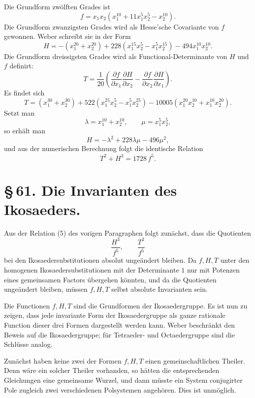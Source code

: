 \documentclass[11pt]{article}
\begin{document}
Die Grundform zwölften Grades ist
\begin{equation}
 f=x_1x_2(x_1^{10}+11x_1^5x_2^5-x_2^{10}).
\tag{1}
\end{equation}
Die Grundform zwanzigsten Grades wird als Hesse'sche Covariante von $f$ gewonnen. Weber schreibt sie in der Form
\begin{equation}
 H=-(x_1^{20}+x_2^{20})
    +228(x_1^{15}x_2^5-x_1^5x_2^{15})
    -494x_1^{10}x_2^{10}.
\tag{2}
\end{equation}
Die Grundform dreissigsten Grades wird als Functional-Determinante von $H$ und $f$ definirt:
\begin{equation}
 T=\frac1{20}\left(
 \frac{\partial f}{\partial x_1}\frac{\partial H}{\partial x_2}
-\frac{\partial f}{\partial x_2}\frac{\partial H}{\partial x_1}\right).
\tag{3}
\end{equation}
Es findet sich
\begin{equation}
 T=(x_1^{30}+x_2^{30})
 +522(x_1^{25}x_2^5-x_1^5x_2^{25})
 -10005(x_1^{20}x_2^{10}+x_1^{10}x_2^{20}).
\tag{4}
\end{equation}
Setzt man
\[
 \lambda=x_1^{10}+x_2^{10},\qquad \mu=x_1^5x_2^5,
\]
so erhält man
\[
 H=-\lambda^2+228\lambda\mu-496\mu^2,
\]
und aus der numerischen Berechnung folgt die identische Relation
\begin{equation}
 T^2+H^3=1728\,f^5.
\tag{5}
\end{equation}

\section*{\S\,61. Die Invarianten des Ikosaeders.}

Aus der Relation (5) des vorigen Paragraphen folgt zunächst, dass die Quotienten
\[
 \frac{H^3}{f^5},\qquad \frac{T^2}{f^5}
\]
bei den Ikosaedersubstitutionen absolut ungeändert bleiben. Da $f,H,T$ unter den homogenen Ikosaedersubstitutionen mit der Determinante $1$ nur mit Potenzen eines gemeinsamen Factors übergehen könnten, und da die Quotienten ungeändert bleiben, müssen $f,H,T$ selbst absolute Invarianten sein.

Die Functionen $f,H,T$ sind die Grundformen der Ikosaedergruppe. Es ist nun zu zeigen, dass jede invariante Form der Ikosaedergruppe als ganze rationale Function dieser drei Formen dargestellt werden kann. Weber beschränkt den Beweis auf die Ikosaedergruppe; für Tetraeder- und Octaedergruppe sind die Schlüsse analog.

Zunächst haben keine zwei der Formen $f,H,T$ einen gemeinschaftlichen Theiler. Denn wäre ein solcher Theiler vorhanden, so hätten die entsprechenden Gleichungen eine gemeinsame Wurzel, und dann müsste ein System conjugirter Pole zugleich zwei verschiedenen Polsystemen angehören. Dies ist unmöglich.
\end{document}
